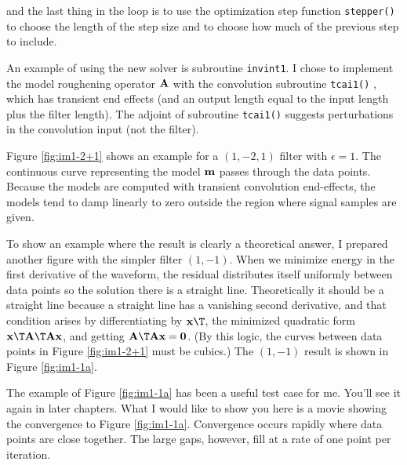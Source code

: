 and the last thing in the loop is to use
the optimization step function \texttt{stepper()} 
to choose the length of the step size
and to choose how much of the previous step to include.
\par
An example of using the new solver is subroutine \texttt{invint1}.
I chose to implement the model roughening operator $\bold A$
with the convolution subroutine \texttt{tcai1()} ,
which has transient end effects
(and an output length equal to the input length plus the filter length).
The adjoint of subroutine {\tt tcai1()} suggests perturbations
in the convolution input (not the filter).
\par
Figure \ref{fig:im1-2+1} shows an example for a $(1,-2,1)$ filter with $\epsilon = 1$.
The continuous curve representing the model $\bold m$
passes through the data points.
Because the models are computed with transient convolution end-effects,
the models tend to damp linearly to zero outside the region where
signal samples are given.
\par
To show an example where the result is clearly a theoretical answer,
I prepared another figure with the simpler filter $(1,-1)$.
When we minimize energy in the first derivative of the waveform,
the residual distributes itself uniformly
between data points
so the solution there is a straight line.
Theoretically it should be a straight line
because a straight line has a vanishing second derivative,
and that condition arises by differentiating by $\bold x\T$,
the minimized quadratic form
$\bold x\T \bold A\T\bold A \bold x$, and getting
$         \bold A\T\bold A \bold x=\bold 0$.
(By this logic, the curves between data points in Figure \ref{fig:im1-2+1}
must be cubics.)
The $(1,-1)$ result is shown in Figure \ref{fig:im1-1a}.
\par
The example of
Figure \ref{fig:im1-1a}
has been a useful test case for me.
You'll see it again in later chapters.
What I would like to show you here is a movie showing the convergence
to Figure \ref{fig:im1-1a}.
Convergence occurs rapidly where data points are close together.
The large gaps, however, fill at a rate of one point per iteration.

